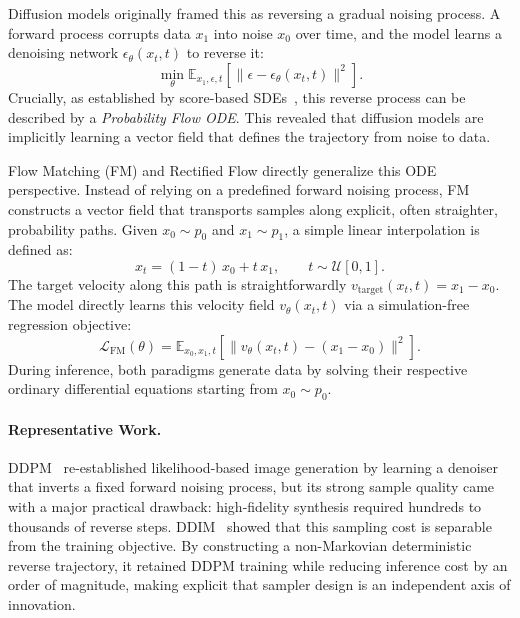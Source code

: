 Diffusion models originally framed this as reversing a gradual noising process. A forward process corrupts data $x_1$ into noise $x_0$ over time, and the model learns a denoising network $\epsilon_\theta(x_t, t)$ to reverse it:
\begin{equation}
\min_\theta \mathbb{E}_{x_1, \epsilon, t} \left[ \| \epsilon - \epsilon_\theta(x_t, t) \|^2 \right].
\end{equation}
Crucially, as established by score-based SDEs~\citep{song2021scorebasedgenerativemodelingstochastic}, this reverse process can be described by a \emph{Probability Flow ODE}. This revealed that diffusion models are implicitly learning a vector field that defines the trajectory from noise to data.

Flow Matching (FM) and Rectified Flow directly generalize this ODE perspective. Instead of relying on a predefined forward noising process, FM constructs a vector field that transports samples along explicit, often straighter, probability paths. Given $x_0 \sim p_0$ and $x_1 \sim p_1$, a simple linear interpolation is defined as:
\begin{equation}
x_t = (1 - t)\, x_0 + t\, x_1, \qquad t \sim \mathcal{U}[0,1].
\end{equation}
The target velocity along this path is straightforwardly $v_{\text{target}}(x_t, t) = x_1 - x_0$. The model directly learns this velocity field $v_\theta(x_t,t)$ via a simulation-free regression objective:
\begin{equation}
\mathcal{L}_{\text{FM}}(\theta) = \mathbb{E}_{x_0, x_1, t} \left[ \bigl\| v_\theta(x_t, t) - (x_1 - x_0) \bigr\|^2 \right].
\end{equation}
During inference, both paradigms generate data by solving their respective ordinary differential equations starting from $x_0 \sim p_0$.

\paragraph{Representative Work.}
DDPM~\citep{ho2020denoising} re-established likelihood-based image generation by learning a denoiser that inverts a fixed forward noising process, but its strong sample quality came with a major practical drawback: high-fidelity synthesis required hundreds to thousands of reverse steps. DDIM~\citep{songDDIM} showed that this sampling cost is separable from the training objective. By constructing a non-Markovian deterministic reverse trajectory, it retained DDPM training while reducing inference cost by an order of magnitude, making explicit that sampler design is an independent axis of innovation.

